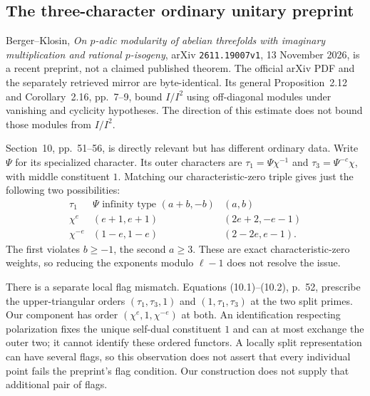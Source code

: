 \documentclass[11pt,a4paper]{article}
\theoremstyle{definition}
\begin{document}
\subsection{The three-character ordinary unitary preprint}

Berger--Klosin, \emph{On $p$-adic modularity of abelian
threefolds with imaginary multiplication and rational
$p$-isogeny}, arXiv \texttt{2611.19007v1}, 13 November
2026, is a recent preprint, not a claimed published
theorem.  The official arXiv PDF and the separately
retrieved mirror are byte-identical.  Its general
Proposition~2.12 and Corollary~2.16, pp.~7--9, bound
$I/I^2$ using off-diagonal modules under vanishing and
cyclicity hypotheses.  The direction of this estimate
does not bound those modules from $I/I^2$.

Section~10, pp.~51--56, is directly relevant but has
different ordinary data.  Write $\Psi$ for its
specialized character.  Its outer characters are
$\tau_1=\Psi\chi^{-1}$ and
$\tau_3=\Psi^{-c}\chi$, with middle constituent $1$.
Matching our characteristic-zero triple gives just
the following two possibilities:
\[
 \begin{array}{c|c|c}
 \tau_1&\Psi\text{ infinity type }(a+b,-b)&(a,b)\\ \hline
 \chi^e&(e+1,e+1)&(2e+2,-e-1)\\
 \chi^{-e}&(1-e,1-e)&(2-2e,e-1).
 \end{array}                                                \tag{RC.4}
\]
The first violates $b\geq-1$, the second $a\geq3$.
These are exact characteristic-zero weights, so reducing
the exponents modulo $\ell-1$ does not resolve the issue.

There is a separate local flag mismatch.  Equations
(10.1)--(10.2), p.~52, prescribe the upper-triangular
orders $(\tau_1,\tau_3,1)$ and $(1,\tau_1,\tau_3)$ at
the two split primes.  Our component has order
$(\chi^e,1,\chi^{-e})$ at both.  An identification
respecting polarization fixes the unique self-dual
constituent $1$ and can at most exchange the outer two;
it cannot identify these ordered functors.  A locally
split representation can have several flags, so this
observation does not assert that every individual point
fails the preprint's flag condition.  Our construction
does not supply that additional pair of flags.
\end{document}
